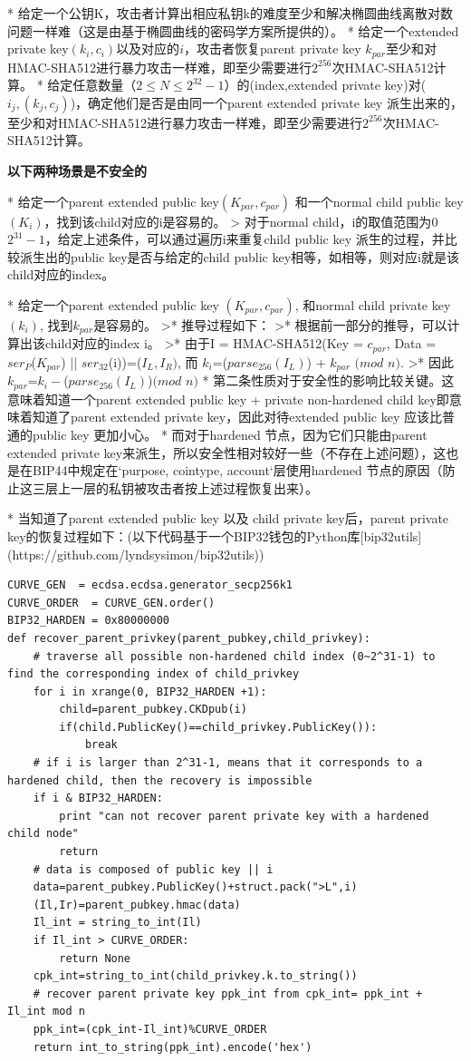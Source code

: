 * 给定一个公钥K，攻击者计算出相应私钥k的难度至少和解决椭圆曲线离散对数问题一样难（这是由基于椭圆曲线的密码学方案所提供的）。
* 给定一个extended private key$(k_i,c_i)$以及对应的$i$，攻击者恢复parent private key $k_{par}$至少和对HMAC-SHA512进行暴力攻击一样难，即至少需要进行$2^{256}$次HMAC-SHA512计算。
* 给定任意数量（$2\leq N\leq 2^{32}-1$）的(index,extended private key)对($i_j,(k_j,c_j)$)，确定他们是否是由同一个parent extended private key 派生出来的，至少和对HMAC-SHA512进行暴力攻击一样难，即至少需要进行$2^{256}$次HMAC-SHA512计算。

\textbf{以下两种场景是不安全的}

* 给定一个parent extended public key$(K_{par},c_{par})$ 和一个normal child public key $(K_i)$，找到该child对应的i是容易的。
> 对于normal child，i的取值范围为$0$~$2^{31}-1$，给定上述条件，可以通过遍历i来重复child public key 派生的过程，并比较派生出的public key是否与给定的child public key相等，如相等，则对应i就是该child对应的index。

* 给定一个parent extended public key $(K_{par},c_{par})$, 和normal child private key $(k_i)$, 找到$k_{par}$是容易的。
>* 推导过程如下：
>* 根据前一部分的推导，可以计算出该child对应的index i。  
>* 由于I = HMAC-SHA512(Key = $c_{par}$, Data = $ser_P$($K_{par}$) || $ser_{32}$(i))=($I_L,I_R)$, 而 $k_i$=($parse_{256}(I_L)$) + $k_{par}$ $(mod$ $n)$.   
>* 因此 $k_{par}$=$k_i-$($parse_{256}(I_L)$)$(mod$ $n)$    
* 第二条性质对于安全性的影响比较关键。这意味着知道一个parent extended public key + private non-hardened child key即意味着知道了parent extended private key，因此对待extended public key 应该比普通的public key 更加小心。
* 而对于hardened 节点，因为它们只能由parent extended private key来派生，所以安全性相对较好一些（不存在上述问题），这也是在BIP44中规定在`purpose, cointype, account`层使用hardened 节点的原因（防止这三层上一层的私钥被攻击者按上述过程恢复出来）。

* 当知道了parent extended public key 以及 child private key后，parent private key的恢复过程如下：(以下代码基于一个BIP32钱包的Python库[bip32utils](https://github.com/lyndsysimon/bip32utils))

\begin{lstlisting}
CURVE_GEN  = ecdsa.ecdsa.generator_secp256k1
CURVE_ORDER  = CURVE_GEN.order()
BIP32_HARDEN = 0x80000000 
def recover_parent_privkey(parent_pubkey,child_privkey):
	# traverse all possible non-hardened child index (0~2^31-1) to find the corresponding index of child_privkey
	for i in xrange(0, BIP32_HARDEN +1):
		child=parent_pubkey.CKDpub(i)
		if(child.PublicKey()==child_privkey.PublicKey()):
			break
    # if i is larger than 2^31-1, means that it corresponds to a hardened child, then the recovery is impossible
	if i & BIP32_HARDEN:
		print "can not recover parent private key with a hardened child node"
		return
	# data is composed of public key || i
	data=parent_pubkey.PublicKey()+struct.pack(">L",i)
	(Il,Ir)=parent_pubkey.hmac(data)
	Il_int = string_to_int(Il)
	if Il_int > CURVE_ORDER:
	    return None
	cpk_int=string_to_int(child_privkey.k.to_string())
	# recover parent private key ppk_int from cpk_int= ppk_int + Il_int mod n
	ppk_int=(cpk_int-Il_int)%CURVE_ORDER
	return int_to_string(ppk_int).encode('hex')
\end{lstlisting}


